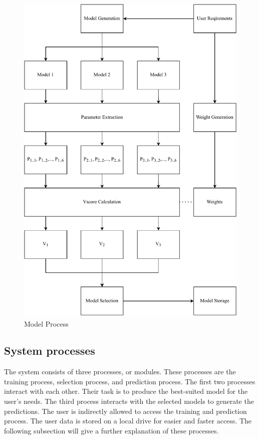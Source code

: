 \documentclass[a4paper,fleqn]{cas-dc}
\begin{document}
\begin{figure}[ht]
    \centering
    \includegraphics[width=1.6\columnwidth]{math_model_relaxed_flow.pdf}
    \caption{Model Process}
    \label{fig:model_process}
\end{figure}

\subsection{System processes}\label{subsec:system_processes}

The system consists of three processes, or modules. These processes are the training process, selection process, and prediction process. The first two processes interact with each other. Their task is to produce the best-suited model for the user's needs. The third process interacts with the selected models to generate the predictions. The user is indirectly allowed to access the training and prediction process. The user data is stored on a local drive for easier and faster access. The following subsection will give a further explanation of these processes.
\end{document}
